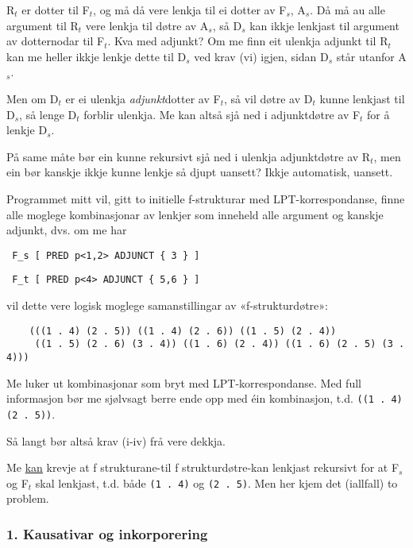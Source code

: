 \documentclass[11pt,a4paper,oneside,draft]{book}
\begin{document}
R$_t$ er dotter til F$_t$, og må då vere lenkja til ei dotter av F$_s$,
A$_s$. Då må au alle argument til R$_t$ vere lenkja til døtre av A$_s$, så
D$_s$ kan ikkje lenkjast til argument av dotternodar til F$_t$. Kva med
adjunkt? Om me finn eit ulenkja adjunkt til R$_t$ kan me heller ikkje
lenkje dette til D$_s$ ved krav (vi) igjen, sidan D$_s$ står utanfor
A$_s$.

Men om D$_t$ er ei ulenkja \emph{adjunkt}dotter av F$_t$, så vil døtre av
D$_t$ kunne lenkjast til D$_s$, så lenge D$_t$ forblir ulenkja. Me kan altså
sjå ned i adjunktdøtre av F$_t$ for å lenkje D$_s$. 

På same måte bør ein kunne rekursivt sjå ned i ulenkja adjunktdøtre av
R$_t$, men ein bør kanskje ikkje kunne lenkje så djupt uansett? Ikkje
automatisk, uansett.



Programmet mitt vil, gitt to initielle f-strukturar med
LPT-korrespondanse, finne alle moglege kombinasjonar av lenkjer som
inneheld alle argument og kanskje adjunkt, dvs. om me har

\begin{verbatim}
 F_s [ PRED p<1,2> ADJUNCT { 3 } ]
\end{verbatim}


\begin{verbatim}
 F_t [ PRED p<4> ADJUNCT { 5,6 } ]
\end{verbatim}


vil dette vere logisk moglege samanstillingar av «f-strukturdøtre»:

\begin{verbatim}
    (((1 . 4) (2 . 5)) ((1 . 4) (2 . 6)) ((1 . 5) (2 . 4))
     ((1 . 5) (2 . 6) (3 . 4)) ((1 . 6) (2 . 4)) ((1 . 6) (2 . 5) (3 . 4)))
\end{verbatim}


Me luker ut kombinasjonar som bryt med LPT-korrespondanse. Med full
informasjon bør me sjølvsagt berre ende opp med éin kombinasjon,
t.d. \texttt{((1 . 4) (2 . 5))}.

Så langt bør altså krav (i-iv) frå \citet{dyvik2009lmp} vere dekkja.

Me \underline{kan} krevje at f strukturane-til f strukturdøtre-kan lenkjast
rekursivt for at F$_s$ og F$_t$ skal lenkjast, t.d. både \texttt{(1 . 4)} og \texttt{(2 . 5)}. Men her kjem det (iallfall) to problem.


\subsubsection{1. Kausativar og inkorporering}
\label{sec-3.6.4.1}
\end{document}
